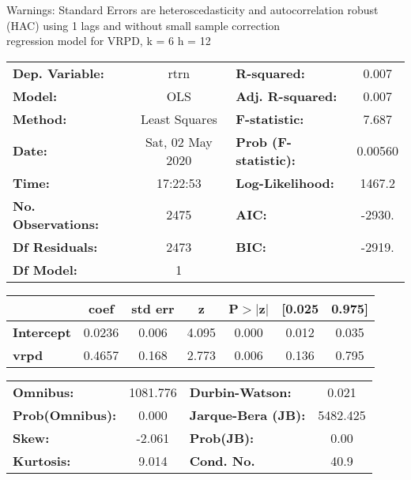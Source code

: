 Warnings: \newline
 [1] Standard Errors are heteroscedasticity and autocorrelation robust (HAC) using 1 lags and without small sample correction\\ 

regression model for VRPD, k = 6 h = 12\begin{center}
\begin{tabular}{lclc}
\toprule
\textbf{Dep. Variable:}    &       rtrn       & \textbf{  R-squared:         } &     0.007   \\
\textbf{Model:}            &       OLS        & \textbf{  Adj. R-squared:    } &     0.007   \\
\textbf{Method:}           &  Least Squares   & \textbf{  F-statistic:       } &     7.687   \\
\textbf{Date:}             & Sat, 02 May 2020 & \textbf{  Prob (F-statistic):} &  0.00560    \\
\textbf{Time:}             &     17:22:53     & \textbf{  Log-Likelihood:    } &    1467.2   \\
\textbf{No. Observations:} &        2475      & \textbf{  AIC:               } &    -2930.   \\
\textbf{Df Residuals:}     &        2473      & \textbf{  BIC:               } &    -2919.   \\
\textbf{Df Model:}         &           1      & \textbf{                     } &             \\
\bottomrule
\end{tabular}
\begin{tabular}{lcccccc}
                   & \textbf{coef} & \textbf{std err} & \textbf{z} & \textbf{P$> |$z$|$} & \textbf{[0.025} & \textbf{0.975]}  \\
\midrule
\textbf{Intercept} &       0.0236  &        0.006     &     4.095  &         0.000        &        0.012    &        0.035     \\
\textbf{vrpd}      &       0.4657  &        0.168     &     2.773  &         0.006        &        0.136    &        0.795     \\
\bottomrule
\end{tabular}
\begin{tabular}{lclc}
\textbf{Omnibus:}       & 1081.776 & \textbf{  Durbin-Watson:     } &    0.021  \\
\textbf{Prob(Omnibus):} &   0.000  & \textbf{  Jarque-Bera (JB):  } & 5482.425  \\
\textbf{Skew:}          &  -2.061  & \textbf{  Prob(JB):          } &     0.00  \\
\textbf{Kurtosis:}      &   9.014  & \textbf{  Cond. No.          } &     40.9  \\
\bottomrule
\end{tabular}
\end{center}

